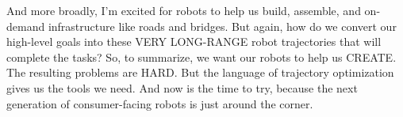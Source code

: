And more broadly, I’m excited for robots to help us build, assemble, and on-demand infrastructure like roads and bridges.
But again, how do we convert our high-level goals into these VERY LONG-RANGE robot trajectories that will complete the tasks?
So, to summarize, we want our robots to help us CREATE. The resulting problems are HARD.
But the language of trajectory optimization gives us the tools we need.
And now is the time to try, because the next generation of consumer-facing robots is just around the corner.
